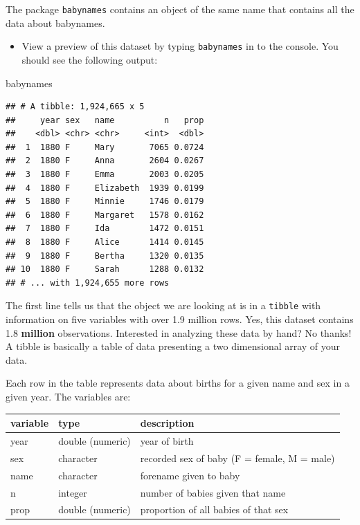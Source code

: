 \documentclass[]{book}
\newenvironment{Shaded}{\begin{snugshade}}{\end{snugshade}}
\newcommand{\NormalTok}[1]{#1}
\providecommand{\tightlist}{%
  \setlength{\itemsep}{0pt}\setlength{\parskip}{0pt}}
\begin{document}
The package \texttt{babynames} contains an object of the same name that contains all the data about babynames.

\begin{itemize}
\tightlist
\item
  View a preview of this dataset by typing \texttt{babynames} in to the console. You should see the following output:
\end{itemize}

\begin{Shaded}
\begin{Highlighting}[]
\NormalTok{babynames}
\end{Highlighting}
\end{Shaded}

\begin{verbatim}
## # A tibble: 1,924,665 x 5
##     year sex   name          n   prop
##    <dbl> <chr> <chr>     <int>  <dbl>
##  1  1880 F     Mary       7065 0.0724
##  2  1880 F     Anna       2604 0.0267
##  3  1880 F     Emma       2003 0.0205
##  4  1880 F     Elizabeth  1939 0.0199
##  5  1880 F     Minnie     1746 0.0179
##  6  1880 F     Margaret   1578 0.0162
##  7  1880 F     Ida        1472 0.0151
##  8  1880 F     Alice      1414 0.0145
##  9  1880 F     Bertha     1320 0.0135
## 10  1880 F     Sarah      1288 0.0132
## # ... with 1,924,655 more rows
\end{verbatim}

The first line tells us that the object we are looking at is in a \texttt{tibble} with information on five variables with over 1.9 million rows. Yes, this dataset contains 1.8 \textbf{million} observations. Interested in analyzing these data by hand? No thanks! A tibble is basically a table of data presenting a two dimensional array of your data.

Each row in the table represents data about births for a given name and sex in a given year. The variables are:

\begin{longtable}[]{@{}lll@{}}
\toprule
variable & type & description\tabularnewline
\midrule
\endhead
year & double (numeric) & year of birth\tabularnewline
sex & character & recorded sex of baby (F = female, M = male)\tabularnewline
name & character & forename given to baby\tabularnewline
n & integer & number of babies given that name\tabularnewline
prop & double (numeric) & proportion of all babies of that sex\tabularnewline
\bottomrule
\end{longtable}
\end{document}
